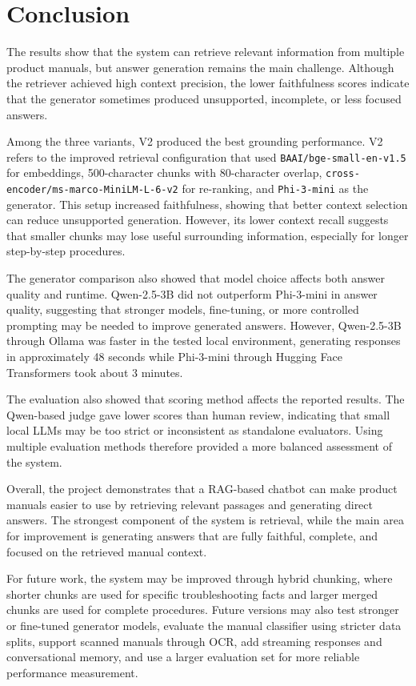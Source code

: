 \section{Conclusion}

The results show that the system can retrieve relevant information from multiple product manuals, but answer generation remains the main challenge. Although the retriever achieved high context precision, the lower faithfulness scores indicate that the generator sometimes produced unsupported, incomplete, or less focused answers.

Among the three variants, V2 produced the best grounding performance. V2 refers to the improved retrieval configuration that used \texttt{BAAI/bge-small-en-v1.5} for embeddings, 500-character chunks with 80-character overlap, \texttt{cross-encoder/\newline ms-marco-MiniLM-L-6-v2} for re-ranking, and \texttt{Phi-3-mini} as the generator. This setup increased faithfulness, showing that better context selection can reduce unsupported generation. However, its lower context recall suggests that smaller chunks may lose useful surrounding information, especially for longer step-by-step procedures.

The generator comparison also showed that model choice affects both answer quality and runtime. Qwen-2.5-3B did not outperform Phi-3-mini in answer quality, suggesting that stronger models, fine-tuning, or more controlled prompting may be needed to improve generated answers. However, Qwen-2.5-3B through Ollama was faster in the tested local environment, generating responses in approximately 48 seconds while Phi-3-mini through Hugging Face Transformers took about 3 minutes. 

The evaluation also showed that scoring method affects the reported results. The Qwen-based judge gave lower scores than human review, indicating that small local LLMs may be too strict or inconsistent as standalone evaluators. Using multiple evaluation methods therefore provided a more balanced assessment of the system.

Overall, the project demonstrates that a RAG-based chatbot can make product manuals easier to use by retrieving relevant passages and generating direct answers. The strongest component of the system is retrieval, while the main area for improvement is generating answers that are fully faithful, complete, and focused on the retrieved manual context.

For future work, the system may be improved through hybrid chunking, where shorter chunks are used for specific troubleshooting facts and larger merged chunks are used for complete procedures. Future versions may also test stronger or fine-tuned generator models, evaluate the manual classifier using stricter data splits, support scanned manuals through OCR, add streaming responses and conversational memory, and use a larger evaluation set for more reliable performance measurement.